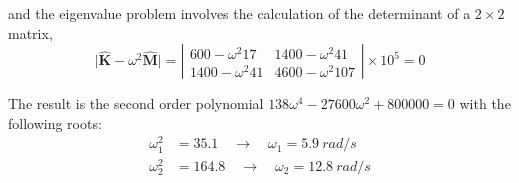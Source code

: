 \begin{Answer}[ref={three_storey}]
and the eigenvalue problem involves the calculation of the determinant of a $2\times2$ matrix,
$$
\vert \hat{\mathbf{K}} - \omega^2 \hat{\mathbf{M}} \vert =
\left\vert \begin{matrix}
    600 -\omega^2 17 & 1400 -\omega^2 41 \\
    1400 -\omega^2 41 & 4600 -\omega^2 107
\end{matrix}
\right\vert \times 10^5 = 0
$$

The result is the second order polynomial
$
138 \omega^4 - 27600 \omega^2 + 800000 = 0
$ with the following roots:
\begin{align*}
\omega_1^2& = 35.1 \quad \rightarrow \quad \omega_1 = \SI{5.9}{rad/s} \\
\omega_2^2& = 164.8 \quad \rightarrow \quad \omega_2 = \SI{12.8}{rad/s} \\
\end{align*}


    
\end{Answer}
